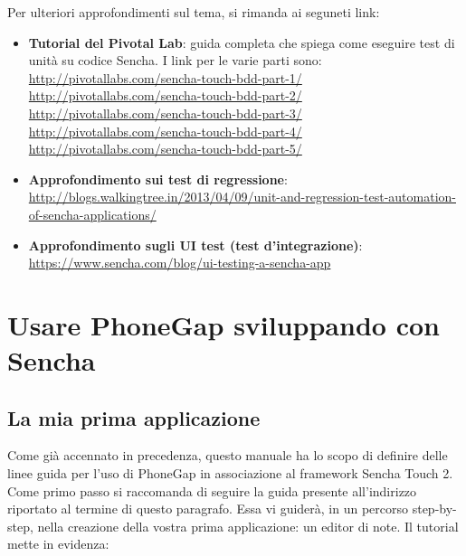 \documentclass[10pt,a4paper,onecolumn]{article}
\begin{document}
Per ulteriori approfondimenti sul tema, si rimanda ai seguneti link:
\begin{itemize}
	\item \textbf{Tutorial del Pivotal Lab}: guida completa che spiega come eseguire test di unità su codice Sencha. I link per le varie parti sono:\\
		\url{http://pivotallabs.com/sencha-touch-bdd-part-1/}\\
		\url{http://pivotallabs.com/sencha-touch-bdd-part-2/}\\
		\url{http://pivotallabs.com/sencha-touch-bdd-part-3/}\\
		\url{http://pivotallabs.com/sencha-touch-bdd-part-4/}\\
		\url{http://pivotallabs.com/sencha-touch-bdd-part-5/}
	
	\item \textbf{Approfondimento sui test di regressione}:\\
		\href{http://blogs.walkingtree.in/2013/04/09/...}{http://blogs.walkingtree.in/2013/04/09/unit-and-regression-test-automation-of-sencha-applications/}
		
	\item \textbf{Approfondimento sugli UI test (test d'integrazione)}:\\
		\url{https://www.sencha.com/blog/ui-testing-a-sencha-app}
\end{itemize}

\clearpage

\section{Usare PhoneGap sviluppando con Sencha}

\subsection{La mia prima applicazione}

Come già accennato in precedenza, questo manuale ha lo scopo di definire delle linee guida per l'uso di PhoneGap in associazione al framework Sencha Touch 2. Come primo passo si raccomanda di seguire la guida presente all'indirizzo riportato al termine di questo paragrafo. Essa vi guiderà, in un percorso step-by-step, nella creazione della vostra prima applicazione: un editor di note. Il tutorial mette in evidenza:
\end{document}

